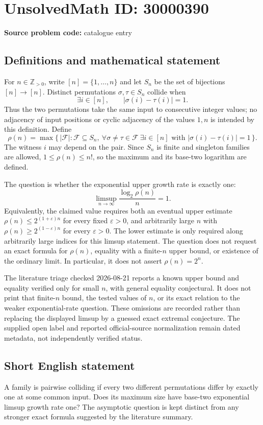 \documentclass[11pt]{article}
\newcommand{\Z}{\mathbb{Z}}
\begin{document}
\section*{UnsolvedMath ID: 30000390}
\textbf{Source problem code:} catalogue entry
\subsection{Definitions and mathematical statement}
For \(n\in\Z_{>0}\), write \([n]=\{1,\ldots,n\}\) and let \(S_n\) be the set of bijections \([n]\to[n]\). Distinct permutations \(\sigma,\tau\in S_n\) collide when
\[
 \exists i\in[n],\qquad |\sigma(i)-\tau(i)|=1.
\]
Thus the two permutations take the same input to consecutive integer values; no adjacency of input positions or cyclic adjacency of the values \(1,n\) is intended by this definition. Define
\[
 \rho(n)=\max\{\,|\mathcal F|:\mathcal F\subseteq S_n,
 \ \forall\sigma\ne\tau\in\mathcal F\ \exists i\in[n]
 \text{ with }|\sigma(i)-\tau(i)|=1\,\}.
\]
The witness \(i\) may depend on the pair. Since \(S_n\) is finite and singleton families are allowed, \(1\leq\rho(n)\leq n!\), so the maximum and its base-two logarithm are defined.

The question is whether the exponential upper growth rate is exactly one:
\[
 \limsup_{n\to\infty}\frac{\log_2\rho(n)}{n}=1.
\]
Equivalently, the claimed value requires both an eventual upper estimate \(\rho(n)\leq2^{(1+\varepsilon)n}\) for every fixed \(\varepsilon>0\), and arbitrarily large \(n\) with \(\rho(n)\geq2^{(1-\varepsilon)n}\) for every \(\varepsilon>0\). The lower estimate is only required along arbitrarily large indices for this limsup statement. The question does not request an exact formula for \(\rho(n)\), equality with a finite-\(n\) upper bound, or existence of the ordinary limit. In particular, it does not assert \(\rho(n)=2^n\).

The literature triage checked 2026-08-21 reports a known upper bound and equality verified only for small \(n\), with general equality conjectural. It does not print that finite-\(n\) bound, the tested values of \(n\), or its exact relation to the weaker exponential-rate question. These omissions are recorded rather than replacing the displayed limsup by a guessed exact extremal conjecture. The supplied open label and reported official-source normalization remain dated metadata, not independently verified status.
\subsection{Short English statement}
A family is pairwise colliding if every two different permutations differ by exactly one at some common input. Does its maximum size have base-two exponential limsup growth rate one? The asymptotic question is kept distinct from any stronger exact formula suggested by the literature summary.
\end{document}
